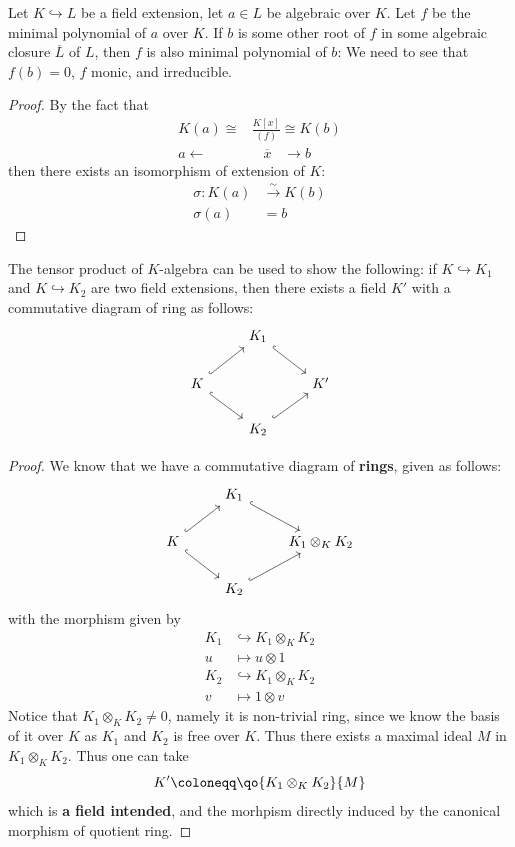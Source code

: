 \begin{remark}
	Let \( K \hookrightarrow L \) be a field extension, let \( a\in L \) be algebraic over \( K \).
	Let \( f \) be the minimal polynomial of \( a \) over \( K \). If \( b \) is some other root of \( f \) in some algebraic
	closure \( \overline{L} \) of \( L \), then \( f \) is also minimal polynomial of \( b \): We need
	to see that \( f(b) = 0 \), \( f \) monic, and irreducible.
	\begin{proof}
		By the fact that
		\[
			\begin{aligned}
				K(a) \cong   & \frac{K[x]}{(f)} \cong K(b)                  \\
				a \leftarrow & \; \; \; \overline{x}\; \; \;  \rightarrow b
			\end{aligned}
		\]
		then there exists an isomorphism of extension of \( K \):
		\[
			\begin{aligned}
				\sigma: K(a) & \xrightarrow{\sim} K(b) \\
				\sigma(a)    & = b
			\end{aligned}
		\]
	\end{proof}
\end{remark}

\begin{remark}
	The tensor product of \( K \)-algebra can be used to show the following:
	if \( K \hookrightarrow K_1 \) and \( K \hookrightarrow K_2 \) are two field extensions, then
	there exists a field \( K' \) with a commutative diagram of ring as follows:
	\[
		\begin{tikzcd}
			& K_1 \arrow[rd, hook] & \\
			K \arrow[ru, hook] \arrow[rd, hook] & & K' \\
			&K_2 \arrow[ru, hook] &
		\end{tikzcd}
	\]
	\begin{proof}
		We know that we have a commutative diagram of \textbf{rings}, given as follows:
		\[
			\begin{tikzcd}
				& K_1 \arrow[rd, hook] & \\
				K \arrow[ru, hook] \arrow[rd, hook] & & K_1\otimes_K K_2 \\
				&K_2 \arrow[ru, hook] &
			\end{tikzcd}
		\]
		with the morphism given by
		\[
			\begin{aligned}
				K_1 & \hookrightarrow K_1\otimes_K K_2 \\
				u   & \mapsto u\otimes 1               \\
				K_2 & \hookrightarrow K_1\otimes_K K_2 \\
				v   & \mapsto 1\otimes v
			\end{aligned}
		\]
		Notice that \( K_1 \otimes_K K_2 \ne 0 \), namely it is non-trivial ring, since we know the
		basis of it over \( K \) as \( K_1 \) and \( K_2 \) is free over \( K \). Thus there exists a
		maximal ideal \( M \) in \( K_1 \otimes_K K_2 \). Thus one can take
		\[
			K' \coloneqq \qo{K_1\otimes_K K_2}{M}
		\]
		which is \textbf{a field intended}, and the morhpism directly induced by the canonical morphism of
		quotient ring.
	\end{proof}
\end{remark}

